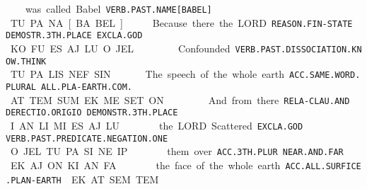 {{\es\ko\si~\ek\Atlana\tos 
\drie
 

was called Babel 

{\tt VERB.PAST.NAME[BABEL] }

TU.PA.NA[BA.BEL] 

\tu\pa\na\cartouche{\pa\pel}
\drie

  

Because 		there 				the LORD  

{\tt REASON.FIN-STATE          DEMOSTR.3TH.PLACE		EXCLA.GOD }

KO.FU			ES.AJ.LU			O.JEL 

\ko\fu~\es\aj\lu~\Atlano\jel
\drie

Confounded 

{\tt VERB.PAST.DISSOCIATION.KNOW.THINK	 }

TU.PA.LIS.NEF.SIN                                               			 

\tu\pa\lis\nef\Atlansin
\drie

 

The speech			 of the whole earth 

{\tt ACC.SAME.WORD.PLURAL 	ALL.PLA-EARTH.COM. }

AT.TEM.SUM			EK.ME.SET.ON 

\at\tem\Atlansum~\ek\me\set\on
\drie

 

And 			from 			there 		

{\tt RELA-CLAU.AND	DERECTIO.ORIGIO      DEMONSTR.3TH.PLACE }

I.AN			LI.MI			ES.AJ.LU			 

\Atlani\an~\li\mi~\es\aj\lu


the LORD	Scattered 

{\tt EXCLA.GOD	VERB.PAST.PREDICATE.NEGATION.ONE }

O.JEL		TU.PA.SI.NE.IP    

\Atlano\jel~\tu\pa\si\Atlanne\ip
\drie

 

 them 		over 		 

{\tt ACC.3TH.PLUR	NEAR.AND.FAR	 }

EK.AJ.ON	KI.AN.FA               

\ek\aj\on~\ki\an\fa
\drie

  

the face of the whole earth. 

{\tt ACC.ALL.SURFICE.PLAN-EARTH }

EK.AT.SEM.TEM 

\ek\at\sem\tem
\drie
\vfill

}}
